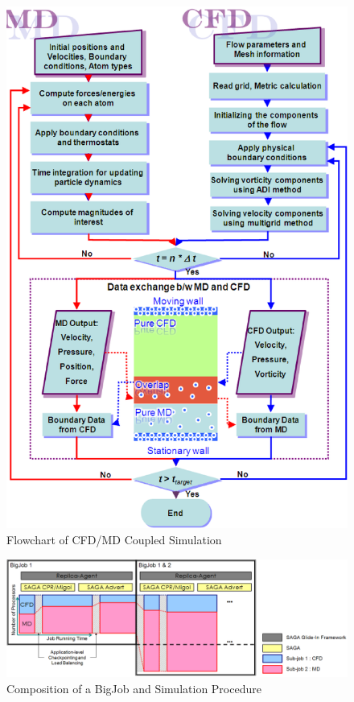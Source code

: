 \documentclass[a4paper]{article}
\begin{document}
\begin{figure}
\centering
\includegraphics [scale=0.3]{fig1.eps}
\caption{Flowchart of CFD/MD Coupled Simulation}
\end{figure}

\begin{figure}
\centering
\includegraphics [scale=0.25]{fig2.eps}
\caption{Composition of a BigJob and Simulation Procedure}
\end{figure}


\noindent 
\end{document}
